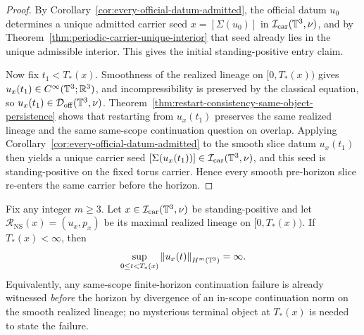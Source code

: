 \begin{proof}
By Corollary~\ref{cor:every-official-datum-admitted}, the official datum $u_0$ determines a unique admitted carrier seed $x=[\Sigma(u_0)]$ in $\mathcal I_{\mathrm{car}}(\mathbb{T}^3,\nu)$, and by Theorem~\ref{thm:periodic-carrier-unique-interior} that seed already lies in the unique admissible interior. This gives the initial standing-positive entry claim.

Now fix $t_1<T_*(x)$. Smoothness of the realized lineage on $[0,T_*(x))$ gives $u_x(t_1)\in C^\infty(\mathbb{T}^3;\mathbb{R}^3)$, and incompressibility is preserved by the classical equation, so $u_x(t_1)\in\mathcal D_{\mathrm{off}}(\mathbb{T}^3,\nu)$. Theorem~\ref{thm:restart-consistency-same-object-persistence} shows that restarting from $u_x(t_1)$ preserves the same realized lineage and the same same-scope continuation question on overlap. Applying Corollary~\ref{cor:every-official-datum-admitted} to the smooth slice datum $u_x(t_1)$ then yields a unique carrier seed $[\Sigma(u_x(t_1))]\in\mathcal I_{\mathrm{car}}(\mathbb{T}^3,\nu)$, and this seed is standing-positive on the fixed torus carrier. Hence every smooth pre-horizon slice re-enters the same carrier before the horizon.
\end{proof}

\begin{manuallemma}
\label{lem:finite-horizon-witness}
Fix any integer $m\ge 3$. Let $x\in\mathcal I_{\mathrm{car}}(\mathbb{T}^3,\nu)$ be standing-positive and let $\mathcal R_{\mathrm{NS}}(x)=(u_x,p_x)$ be its maximal realized lineage on $[0,T_*(x))$. If $T_*(x)<\infty$, then
\[
\sup_{0\le t<T_*(x)} \left\lVert u_x(t)\right\rVert_{H^m(\mathbb{T}^3)}=\infty.
\]
Equivalently, any same-scope finite-horizon continuation failure is already witnessed \emph{before} the horizon by divergence of an in-scope continuation norm on the smooth realized lineage; no mysterious terminal object at $T_*(x)$ is needed to state the failure.
\end{manuallemma}


